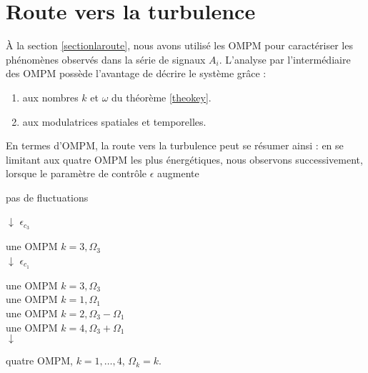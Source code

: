 \documentclass{book}
\begin{document}
\section{Route vers la turbulence}
\`A la section \ref{sectionlaroute}, nous avons utilis\'e les OMPM
pour caract\'eriser les ph\'enom\`enes observ\'es dans la s\'erie de
signaux $A_i$. L'analyse par
l'interm\'ediaire des OMPM poss\`ede l'avantage de d\'ecrire le
syst\`eme gr\^ace :
\begin{enumerate}
\item aux nombres $k$ et $\omega$ du th\'eor\`eme \ref{theokey}.
\item aux modulatrices spatiales et temporelles.
\end{enumerate}

En termes d'OMPM, la route vers la turbulence peut se r\'esumer ainsi
: 
en se limitant aux quatre OMPM les plus \'energ\'etiques, nous observons 
successivement, lorsque le param\`etre de contr\^ole $\epsilon$ augmente

\begin{center}
pas de fluctuations


$\downarrow$ $\epsilon_{c_3}$


une OMPM $k=3,\Omega_3$\\


$\downarrow$ $\epsilon_{c_1}$


une OMPM $k=3,\Omega_3$\\
une OMPM $k=1,\Omega_1$\\
une OMPM $k=2,\Omega_3-\Omega_1$\\
une OMPM $k=4,\Omega_3+\Omega_1$\\


$\downarrow$


quatre OMPM, $k=1,\dots,4$, $\Omega_k=k$.

\end{center}
\end{document}
